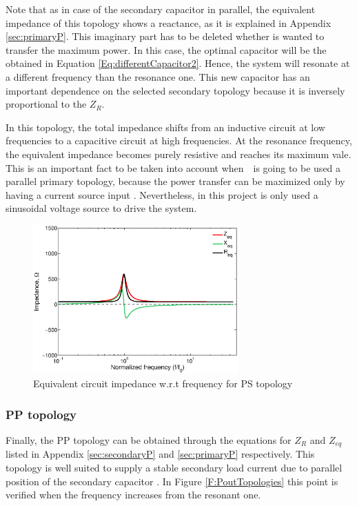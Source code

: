 Note that as in case of the secondary capacitor in parallel, the equivalent impedance of this topology shows a reactance, as it is explained in Appendix \ref{sec:primaryP}. This imaginary part has to be deleted whether is wanted to transfer the maximum power. In this case, the optimal capacitor will be the obtained in Equation \ref{Eq:differentCapacitor2}. Hence, the system will resonate at a different frequency than the resonance one. This new capacitor has an important dependence on the selected secondary topology because it is inversely proportional to the $Z_R$.

In this topology, the total impedance shifts from an inductive circuit at low frequencies to a capacitive circuit at high frequencies. At the resonance frequency, the equivalent impedance becomes purely resistive and reaches its maximum vale. This is an important fact to be taken into account when  is going to be used a parallel primary topology, because the power transfer can be maximized only by having a current source input \cite{delft}. Nevertheless, in this project is only used a sinusoidal voltage source to drive the system.

\begin{figure}[h!]
\begin{center}
\includegraphics[width=0.7\textwidth]{./images/PS_impedance} 
\caption{Equivalent circuit impedance w.r.t frequency for PS topology}
\end{center}
\end{figure}

\subsubsection{PP topology}

Finally, the PP topology can be obtained through the equations for $Z_R$ and $Z_{eq}$ listed in Appendix \ref{sec:secondaryP} and \ref{sec:primaryP} respectively. This topology is well suited to supply a stable secondary load current due to parallel position of the secondary capacitor \cite{meyer}.
In Figure \ref{F:PoutTopologies} this point is verified when the frequency increases from the resonant one.

